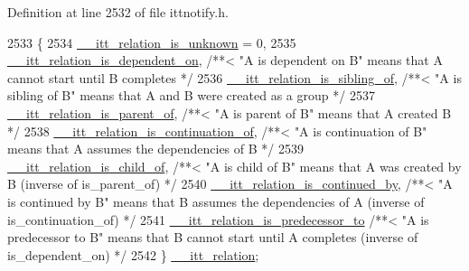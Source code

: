 Definition at line 2532 of file ittnotify.\-h.


\begin{DoxyCode}
2533 \{
2534     \hyperlink{group__relations_gga2f588e0d778ac0cca7cc0b64cfb1bdcaa1a459a9e26ce70786921b894dca23272}{\_\_itt\_relation\_is\_unknown} = 0,
2535     \hyperlink{group__relations_gga2f588e0d778ac0cca7cc0b64cfb1bdcaa04baff009ada30040481b41a79f4f593}{\_\_itt\_relation\_is\_dependent\_on},         \textcolor{comment}{/**< "A is dependent on B" means
       that A cannot start until B completes */}
2536     \hyperlink{group__relations_gga2f588e0d778ac0cca7cc0b64cfb1bdcaab47399cff08b5c6b90fd5db7d06f46c2}{\_\_itt\_relation\_is\_sibling\_of},           \textcolor{comment}{/**< "A is sibling of B" means that
       A and B were created as a group */}
2537     \hyperlink{group__relations_gga2f588e0d778ac0cca7cc0b64cfb1bdcaa157629a13cd4b3fda5a0ebaab75fe707}{\_\_itt\_relation\_is\_parent\_of},            \textcolor{comment}{/**< "A is parent of B" means that A
       created B */}
2538     \hyperlink{group__relations_gga2f588e0d778ac0cca7cc0b64cfb1bdcaa1e41b50db9c794d31bdcd594993b4b6f}{\_\_itt\_relation\_is\_continuation\_of},      \textcolor{comment}{/**< "A is continuation of B"
       means that A assumes the dependencies of B */}
2539     \hyperlink{group__relations_gga2f588e0d778ac0cca7cc0b64cfb1bdcaa0996403dd9c42c69163e2c6321d5cf37}{\_\_itt\_relation\_is\_child\_of},             \textcolor{comment}{/**< "A is child of B" means that A
       was created by B (inverse of is\_parent\_of) */}
2540     \hyperlink{group__relations_gga2f588e0d778ac0cca7cc0b64cfb1bdcaa4d343a796c9e120c638b451d9ce7c001}{\_\_itt\_relation\_is\_continued\_by},         \textcolor{comment}{/**< "A is continued by B" means
       that B assumes the dependencies of A (inverse of is\_continuation\_of) */}
2541     \hyperlink{group__relations_gga2f588e0d778ac0cca7cc0b64cfb1bdcaae91984fad33dfb746f08f0db95df3279}{\_\_itt\_relation\_is\_predecessor\_to}        \textcolor{comment}{/**< "A is predecessor to B"
       means that B cannot start until A completes (inverse of is\_dependent\_on) */}
2542 \} \hyperlink{group__relations_ga2f588e0d778ac0cca7cc0b64cfb1bdca}{\_\_itt\_relation};
\end{DoxyCode}


